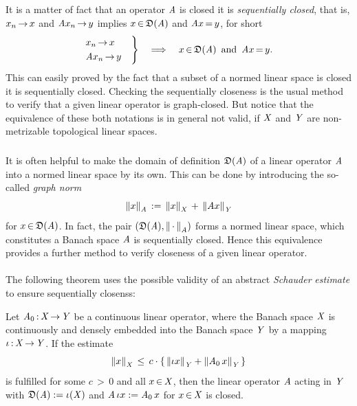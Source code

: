 \documentclass[11pt,twoside]{article}
\begin{document}
\begin{itemize}[leftmargin=12pt,itemsep=3pt]
\subparagraph{} %
It is a matter of fact
that an operator $\mathit{A}$ is closed \iff it is \textit{sequentially closed},
that is,
$x_n {\,\to\,} x$ and $\mathit{A} x_n {\,\to\,} y$ implies
$x {\,\in\,} \mathfrak{D}(\mathit{A})$ and $\mathit{A} x {\,=\,} y$,
for short
\[
\begin{rcases}
 x_n       {\,\to\,} x \quad \\
 \mathit{A} x_n {\,\to\,} y \quad \\
\end{rcases}
\quad \Longrightarrow \quad
x {\,\in\,} \mathfrak{D}(\mathit{A}) \, \mbox{ and } \, \mathit{A} x {\,=\,} y.
\]
This can easily proved by the fact
that a subset of a normed linear space is closed
\iff it is sequentially closed.
Checking the sequentially closeness is the usual method
to verify that a given linear operator is graph-closed.
But notice that the equivalence of these both notations is in general not valid,
if $\mathit{X}$ and $\mathit{Y}$ are non-metrizable topological linear spaces.

\subparagraph{} %
It is often helpful to make the domain of definition $\mathfrak{D}(\mathit{A})$
of a linear operator $\mathit{A}$ into a normed linear space by its own.
This can be done by introducing the so-called \textit{graph norm}
\[
\left\lVert x \right\rVert_{\mathit{A}} \,:=\, \left\lVert x \right\rVert_{\mathit{X}} \,+\, \left\lVert \mathit{A} x \right\rVert_{\mathit{Y}}
\]
for $x {\,\in\,} \mathfrak{D}(\mathit{A})$.
In fact,
the pair $(\mathfrak{D}(\mathit{A}),\left\lVert \,\cdot\, \right\rVert_{\mathit{A}})$
forms a normed linear space,
which constitutes a Banach space \iff 
$\mathit{A}$ is sequentially closed.
Hence this equivalence provides a further method
to verify closeness of a given linear operator.

\paragraph{} %
The following theorem
uses the possible validity of an abstract \textit{Schauder} \textit{estimate}
to ensure sequentially closenss:

\begin{theorem}\label{BROWDER_THEOREM}
Let $\mathit{A}_0 {\,:\,} \mathit{X} {\,\to\,} \mathit{Y}$ be a continuous linear operator,
where the Banach space $\mathit{X}$ is continuously and densely embedded
into the Banach space $\mathit{Y}$ by a mapping $\iota {\,:\,} \mathit{X} {\,\to\,} \mathit{Y}$.
If the estimate
\begin{equation}\label{SCHAUDER_ESTIMATE}
\left\lVert x \right\rVert_{\mathit{X}} \, \leq \,
c \cdot
\{ \,\left\lVert \iota x \right\rVert_{\mathit{Y}} + \left\lVert \mathit{A}_0 \, x \right\rVert_{\mathit{Y}} \, \}
\end{equation}
is fulfilled for some $c {\,>\,} 0$ and all $x {\,\in\,} \mathit{X}$,
then the linear operator $\mathit{A}$ acting in $\mathit{Y}$ with
$\mathfrak{D}(\mathit{A}) := \iota(\mathit{X})$ and
$\mathit{A}\, \iota x := \mathit{A}_0 \, x$ for $x {\,\in\,} \mathit{X}$ is closed.
\end{theorem}


\end{itemize}
\end{document}
